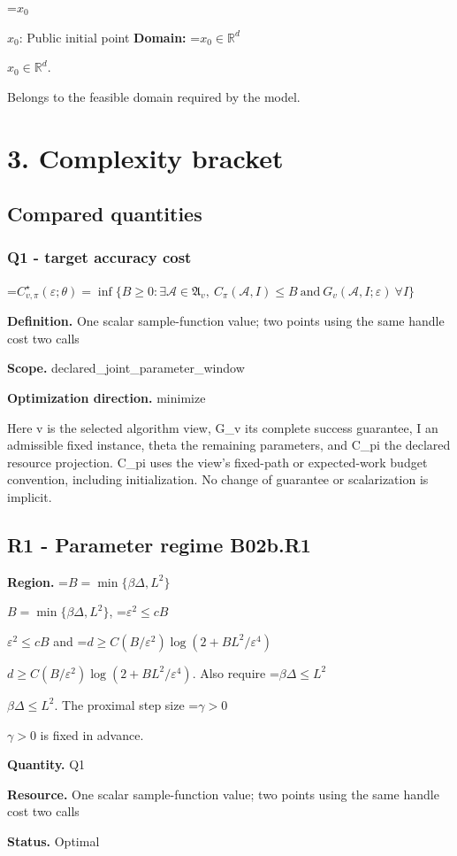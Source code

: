 \documentclass[10pt,a4paper]{article}
\newcommand{\AtlasMath}[1]{\par\begingroup\centering\setbox0=\hbox{$\displaystyle #1$}\ifdim\wd0>1.4\linewidth\typeout{ATLAS WIDE FORMULA: \the\wd0}\fi\ifdim\wd0>\linewidth\resizebox{\linewidth}{!}{\box0}\else\box0\fi\par\endgroup}
\newcommand{\AtlasInlineMath}[1]{\begingroup\setbox0=\hbox{$#1$}\ifdim\wd0>.4\linewidth\endgroup\AtlasMath{#1}\else\endgroup$#1$\fi}
\begin{document}
\AtlasInlineMath{x_0}: Public initial point \textbf{Domain:} \AtlasInlineMath{x_0\in\mathbb{R}^d}.

Belongs to the feasible domain required by the model.

\section{3. Complexity bracket}
\subsection{Compared quantities}
\subsubsection{Q1 - target accuracy cost}
\AtlasMath{C^\star_{v,\pi}(\varepsilon;\theta)=\inf\{B\ge0:\exists\mathcal A\in\mathfrak A_v,\ C_\pi(\mathcal A,I)\le B\ \text{and}\ G_v(\mathcal A,I;\varepsilon)\ \forall I\}}
\textbf{Definition.} One scalar sample-function value; two points using the same handle cost two calls

\textbf{Scope.} declared\_joint\_parameter\_window

\textbf{Optimization direction.} minimize

Here v is the selected algorithm view, G\_v its complete success guarantee, I an admissible fixed instance, theta the remaining parameters, and C\_pi the declared resource projection. C\_pi uses the view's fixed-path or expected-work budget convention, including initialization. No change of guarantee or scalarization is implicit.

\subsection{R1 - Parameter regime B02b.R1}
\textbf{Region.} \AtlasInlineMath{B=\min\{\beta\Delta,L^2\}}, \AtlasInlineMath{\varepsilon^2\le cB} and \AtlasInlineMath{d\ge C(B/\varepsilon^2)\log(2+BL^2/\varepsilon^4)}. Also require \AtlasInlineMath{\beta\Delta\le L^2}. The proximal step size \AtlasInlineMath{\gamma>0} is fixed in advance.

\textbf{Quantity.} Q1

\textbf{Resource.} One scalar sample-function value; two points using the same handle cost two calls

\textbf{Status.} Optimal
\end{document}
